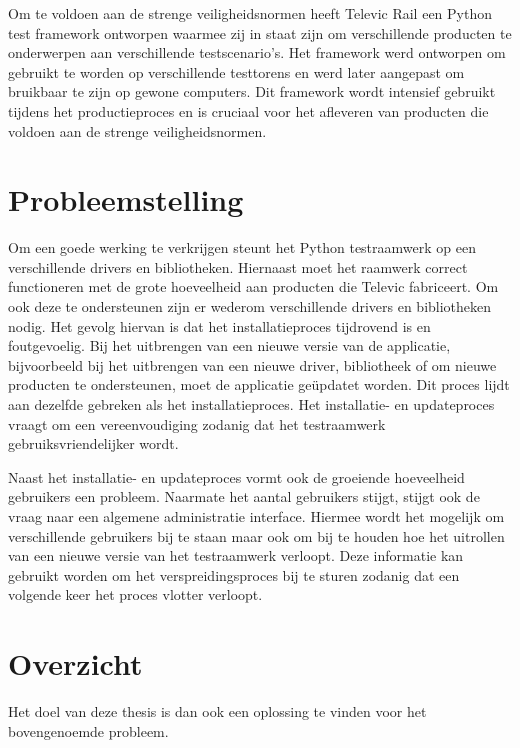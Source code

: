 Om te voldoen aan de strenge veiligheidsnormen heeft Televic Rail een Python test framework ontworpen waarmee zij in staat zijn om verschillende producten te onderwerpen aan verschillende testscenario's.
Het framework werd ontworpen om gebruikt te worden op verschillende testtorens en werd later aangepast om bruikbaar te zijn op gewone computers.
Dit framework wordt intensief gebruikt tijdens het productieproces en is cruciaal voor het afleveren van producten die voldoen aan de strenge veiligheidsnormen.


\section{Probleemstelling}\label{sec:probleem}
Om een goede werking te verkrijgen steunt het Python testraamwerk op een verschillende drivers en bibliotheken.
Hiernaast moet het raamwerk correct functioneren met de grote hoeveelheid aan producten die Televic fabriceert.
Om ook deze te ondersteunen zijn er wederom verschillende drivers en bibliotheken nodig.
Het gevolg hiervan is dat het installatieproces tijdrovend is en foutgevoelig.
Bij het uitbrengen van een nieuwe versie van de applicatie, bijvoorbeeld bij het uitbrengen van een nieuwe driver, bibliotheek of om nieuwe producten te ondersteunen, moet de applicatie geüpdatet worden.
Dit proces lijdt aan dezelfde gebreken als het installatieproces.
Het installatie- en updateproces vraagt om een vereenvoudiging zodanig dat het testraamwerk gebruiksvriendelijker wordt.

Naast het installatie- en updateproces vormt ook de groeiende hoeveelheid gebruikers een probleem.
Naarmate het aantal gebruikers stijgt, stijgt ook de vraag naar een algemene administratie interface.
Hiermee wordt het mogelijk om verschillende gebruikers bij te staan maar ook om bij te houden hoe het uitrollen van een nieuwe versie van het testraamwerk verloopt.
Deze informatie kan gebruikt worden om het verspreidingsproces bij te sturen zodanig dat een volgende keer het proces vlotter verloopt.

\section{Overzicht}
Het doel van deze thesis is dan ook een oplossing te vinden voor het bovengenoemde probleem.